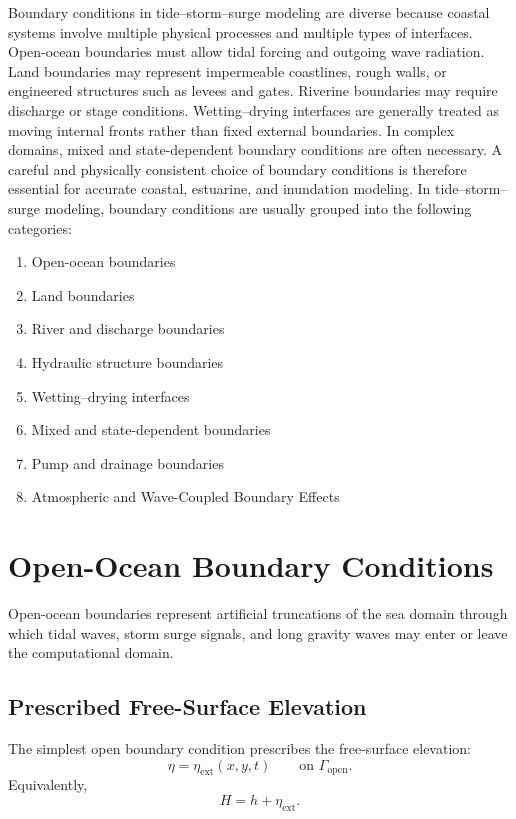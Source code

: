 \documentclass[11pt]{article}
\begin{document}
Boundary conditions in tide--storm--surge modeling are diverse because coastal systems involve multiple physical processes and multiple types of interfaces. Open-ocean boundaries must allow tidal forcing and outgoing wave radiation. Land boundaries may represent impermeable coastlines, rough walls, or engineered structures such as levees and gates. Riverine boundaries may require discharge or stage conditions. Wetting--drying interfaces are generally treated as moving internal fronts rather than fixed external boundaries. In complex domains, mixed and state-dependent boundary conditions are often necessary. A careful and physically consistent choice of boundary conditions is therefore essential for accurate coastal, estuarine, and inundation modeling. In tide--storm--surge modeling, boundary conditions are usually grouped into the following categories:
\begin{enumerate}[leftmargin=2em]
    \item Open-ocean boundaries
    \item Land boundaries
    \item River and discharge boundaries
    \item Hydraulic structure boundaries
    \item Wetting--drying interfaces
    \item Mixed and state-dependent boundaries
    \item Pump and drainage boundaries
    \item Atmospheric and Wave-Coupled Boundary Effects
\end{enumerate}


\section{Open-Ocean Boundary Conditions}

Open-ocean boundaries represent artificial truncations of the sea domain through which tidal waves, storm surge signals, and long gravity waves may enter or leave the computational domain.

\subsection{Prescribed Free-Surface Elevation}

The simplest open boundary condition prescribes the free-surface elevation:
\begin{equation}
\eta = \eta_{\mathrm{ext}}(x,y,t)
\qquad \text{on } \Gamma_{\mathrm{open}}.
\end{equation}
Equivalently,
\begin{equation}
H = h + \eta_{\mathrm{ext}}.
\end{equation}
\end{document}
